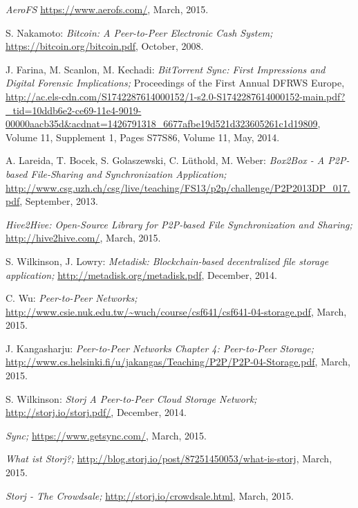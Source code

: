 \begin{thebibliography}{99}
		\emph{AeroFS}
		\url{https://www.aerofs.com/},
		March, 2015.

		S. Nakamoto:
		\emph{Bitcoin: A Peer-to-Peer Electronic Cash System;}
		\url{https://bitcoin.org/bitcoin.pdf},
		October, 2008.

		J. Farina, M. Scanlon, M. Kechadi:
		\emph{BitTorrent Sync: First Impressions and Digital Forensic Implications;}
		Proceedings of the First Annual DFRWS Europe,
		\url{http://ac.els-cdn.com/S1742287614000152/1-s2.0-S1742287614000152-main.pdf?_tid=10ddb6e2-ce69-11e4-9019-00000aacb35d&acdnat=1426791318_6677afbe19d521d323605261c1d19809},
		Volume 11, Supplement 1, Pages S77\textendash S86, Volume 11, May, 2014.

		A. Lareida, T. Bocek, S. Golaszewski, C. L\"uthold, M. Weber:
		\emph{Box2Box - A P2P-based File-Sharing and Synchronization Application;}
		\url{http://www.csg.uzh.ch/csg/live/teaching/FS13/p2p/challenge/P2P2013DP_017.pdf},
		September, 2013.

		\emph{Hive2Hive: Open-Source Library for P2P-based File Synchronization and Sharing;}
		\url{http://hive2hive.com/},
		March, 2015.

		S. Wilkinson, J. Lowry:
		\emph{Metadisk: Blockchain-based decentralized file storage application;}
		\url{http://metadisk.org/metadisk.pdf},
		December, 2014.

		C. Wu:
		\emph{Peer-to-Peer Networks;}
		\url{http://www.csie.nuk.edu.tw/~wuch/course/csf641/csf641-04-storage.pdf},
		March, 2015.

		J. Kangasharju:
		\emph{Peer-to-Peer Networks Chapter 4: Peer-to-Peer Storage;}
		\url{http://www.cs.helsinki.fi/u/jakangas/Teaching/P2P/P2P-04-Storage.pdf},
		March, 2015.

		S. Wilkinson:
		\emph{Storj A Peer-to-Peer Cloud Storage Network;}
		\url{http://storj.io/storj.pdf/},
		December, 2014.

		\emph{Sync;}
		\url{https://www.getsync.com/},
		March, 2015.
		
		\emph{What ist Storj?;}
		\url{http://blog.storj.io/post/87251450053/what-is-storj},
		March, 2015.
		
		\emph{Storj - The Crowdsale;}
		\url{http://storj.io/crowdsale.html},
		March, 2015.


\end{thebibliography}
